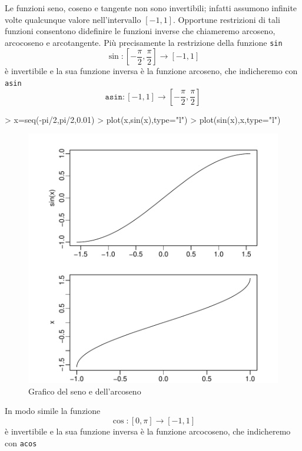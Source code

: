 \documentclass[onecolumn,11pt]{book}
\begin{document}
Le funzioni seno, coseno e tangente non sono invertibili; infatti assumono infinite volte qualcunque valore nell'intervallo $[-1,1]$.
Opportune restrizioni di tali funzioni consentono didefinire le funzioni inverse che chiameremo arcoseno, arcocoseno e arcotangente. Pi\`u precisamente
la restrizione della funzione \texttt{sin}
$$\sin\colon [-\frac{\pi}{2},\frac{\pi}{2}]\rightarrow [-1,1]$$
\`e invertibile e la sua funzione inversa \`e  la funzione arcoseno, che indicheremo con \texttt{asin}
$$\texttt{asin}\colon  [-1,1]\rightarrow [-\frac{\pi}{2},\frac{\pi}{2}]$$
\begin{Schunk}
\begin{Sinput}
> x=seq(-pi/2,pi/2,0.01)
> plot(x,sin(x),type="l")
> plot(sin(x),x,type="l")
\end{Sinput}
\end{Schunk}
\begin{center}\begin{figure}

\includegraphics{RbookParte1-106}
\caption{Grafico del seno e dell'arcoseno}
\end{figure}

\end{center}
In modo simile la funzione
$$\cos\colon [0,\pi]\rightarrow [-1,1]$$
 \`e invertibile e la sua funzione inversa \`e  la funzione arcocoseno, che indicheremo con \texttt{acos}
\end{document}
